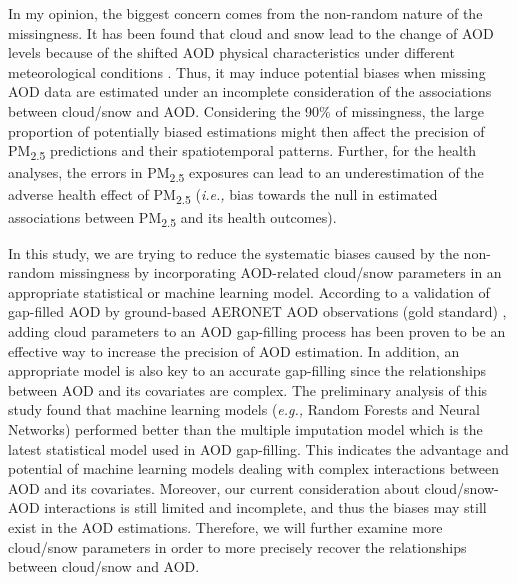 \documentclass[11pt]{article}
\newcommand{\tsub}{\textsubscript}
\begin{document}
\begin{enumerate*}[{[a)]}]
    \item In my opinion, the biggest concern comes from the non-random nature of the missingness. It has been found that cloud and snow lead to the change of AOD levels because of the shifted AOD physical characteristics under different meteorological conditions \citep{alam2014variability, kang2015correlation, emili2011high}. Thus, it may induce potential biases when missing AOD data are estimated under an incomplete consideration of the associations between cloud/snow and AOD. Considering the 90\% of missingness, the large proportion of potentially biased estimations might then affect the precision of PM\tsub{2.5} predictions and their spatiotemporal patterns. Further, for the health analyses, the errors in PM\tsub{2.5} exposures can lead to an underestimation of the adverse health effect of PM\tsub{2.5} \citep{sarnat2015fine} (\textit{i.e.,} bias towards the null in estimated associations between PM\tsub{2.5} and its health outcomes).
    
    \item In this study, we are trying to reduce the systematic biases caused by the non-random missingness by incorporating AOD-related cloud/snow parameters in an appropriate statistical or machine learning model. According to a validation of gap-filled AOD by ground-based AERONET AOD observations (gold standard) \citep{xiao2017full}, adding cloud parameters to an AOD gap-filling process has been proven to be an effective way to increase the precision of AOD estimation. In addition, an appropriate model is also key to an accurate gap-filling since the relationships between AOD and its covariates are complex. The preliminary analysis of this study found that machine learning models (\textit{e.g.,} Random Forests and Neural Networks) performed better than the multiple imputation model \citep{xiao2017full} which is the latest statistical model used in AOD gap-filling. This indicates the advantage and potential of machine learning models dealing with complex interactions between AOD and its covariates. Moreover, our current consideration about cloud/snow-AOD interactions is still limited and incomplete, and thus the biases may still exist in the AOD estimations. Therefore, we will further examine more cloud/snow parameters in order to more precisely recover the relationships between cloud/snow and AOD.
\end{enumerate*}
\end{document}
